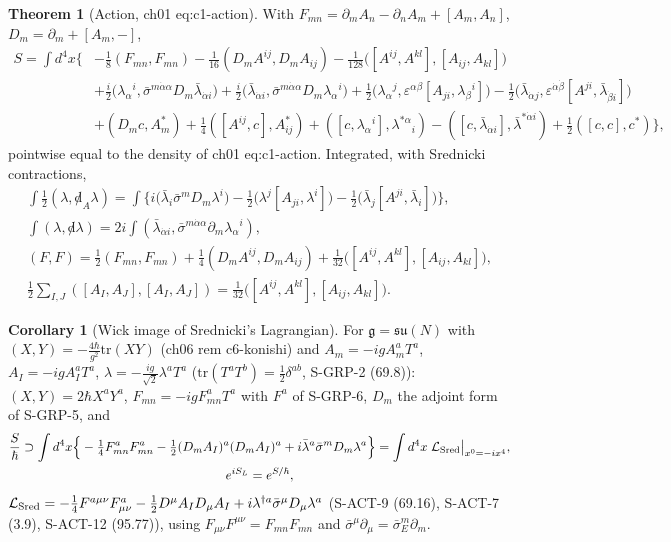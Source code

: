 \documentclass[11pt]{article}
\theoremstyle{definition}
\newtheorem{theorem}[definition]{Theorem}
\newtheorem{corollary}[definition]{Corollary}
\begin{document}
\begin{theorem}[Action, ch01 eq:c1-action]\label{thm:action}
With $F_{mn}=\partial_mA_n-\partial_nA_m+[A_m,A_n]$, $D_m=\partial_m+[A_m,-]$,
\begin{align*}
S=\int d^4x\Big\{&-\tfrac18(F_{mn},F_{mn})-\tfrac1{16}(D_mA^{ij},D_mA_{ij})-\tfrac1{128}\big([A^{ij},A^{kl}],[A_{ij},A_{kl}]\big)\\
&+\tfrac i2\big(\lambda_\alpha{}^i,\bar\sigma^{m\dot\alpha\alpha}D_m\bar\lambda_{\dot\alpha i}\big)+\tfrac i2\big(\bar\lambda_{\dot\alpha i},\bar\sigma^{m\dot\alpha\alpha}D_m\lambda_\alpha{}^i\big)
+\tfrac12\big(\lambda_\alpha{}^j,\varepsilon^{\alpha\beta}[A_{ji},\lambda_\beta{}^i]\big)-\tfrac12\big(\bar\lambda_{\dot\alpha j},\varepsilon^{\dot\alpha\dot\beta}[A^{ji},\bar\lambda_{\dot\beta i}]\big)\\
&+(D_mc,A^*_m)+\tfrac14([A^{ij},c],A^*_{ij})+([c,\lambda_\alpha{}^i],\lambda^{*\alpha}{}_i)-([c,\bar\lambda_{\dot\alpha i}],\bar\lambda^{*\dot\alpha i})+\tfrac12([c,c],c^*)\Big\},
\end{align*}
pointwise equal to the density of ch01 eq:c1-action. Integrated, with Srednicki contractions,
\begin{gather*}
\int\tfrac12(\lambda,{\not d}_A\lambda)=\int\Big\{i\big(\bar\lambda_i\bar\sigma^mD_m\lambda^i\big)-\tfrac12\big(\lambda^j[A_{ji},\lambda^i]\big)-\tfrac12\big(\bar\lambda_j[A^{ji},\bar\lambda_i]\big)\Big\},\\
\int(\lambda,{\not d}\lambda)=2i\int(\bar\lambda_{\dot\alpha i},\bar\sigma^{m\dot\alpha\alpha}\partial_m\lambda_\alpha{}^i),\\
(F,F)=\tfrac12(F_{mn},F_{mn})+\tfrac14(D_mA^{ij},D_mA_{ij})+\tfrac1{32}\big([A^{ij},A^{kl}],[A_{ij},A_{kl}]\big),\\
\tfrac12\sum_{I,J}([A_I,A_J],[A_I,A_J])=\tfrac1{32}\big([A^{ij},A^{kl}],[A_{ij},A_{kl}]\big).
\end{gather*}
\end{theorem}

\begin{corollary}[Wick image of Srednicki's Lagrangian]\label{cor:wick}
For $\mathfrak g=\mathfrak{su}(N)$ with $(X,Y)=-\tfrac{4\hbar}{g^2}\mathrm{tr}(XY)$ (ch06 rem c6-konishi) and $A_m=-igA^a_mT^a$, $A_I=-igA^a_IT^a$, $\lambda=-\tfrac{ig}{\sqrt2}\lambda^aT^a$ ($\mathrm{tr}(T^aT^b)=\tfrac12\delta^{ab}$, S-GRP-2 (69.8)): $(X,Y)=2\hbar X^aY^a$, $F_{mn}=-igF^a_{mn}T^a$ with $F^a$ of S-GRP-6, $D_m$ the adjoint form of S-GRP-5, and
\begin{gather*}
\frac S\hbar\supset\int d^4x\Big\{-\tfrac14F^a_{mn}F^a_{mn}-\tfrac12(D_mA_I)^a(D_mA_I)^a+i\bar\lambda^a\bar\sigma^mD_m\lambda^a\Big\}
=\int d^4x\;\mathcal L_{\rm Sred}\big|_{x^0=-ix^4},\\ e^{iS_L}=e^{S/\hbar},
\end{gather*}
$\mathcal L_{\rm Sred}=-\tfrac14F^{a\mu\nu}F^a_{\mu\nu}-\tfrac12D^\mu A_ID_\mu A_I+i\lambda^{\dagger a}\bar\sigma^\mu D_\mu\lambda^a$ (S-ACT-9 (69.16), S-ACT-7 (3.9), S-ACT-12 (95.77)), using $F_{\mu\nu}F^{\mu\nu}=F_{mn}F_{mn}$ and $\bar\sigma^\mu\partial_\mu=\bar\sigma^m_E\partial_m$.
\end{corollary}
\end{document}
